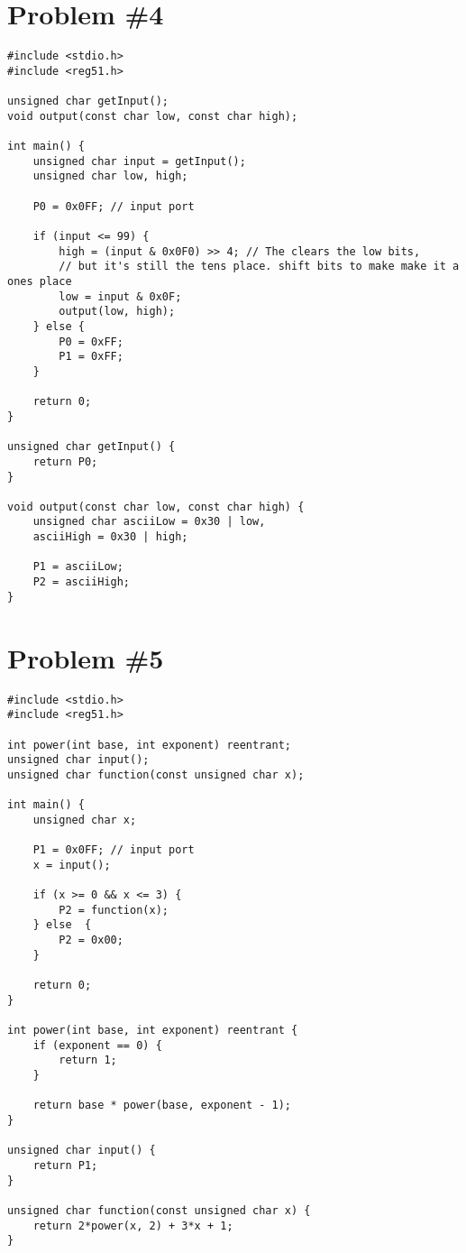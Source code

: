 \documentclass[12pt]{article}
\begin{document}
\section{Problem \#4}
\begin{verbatim}
#include <stdio.h>
#include <reg51.h>

unsigned char getInput();
void output(const char low, const char high);

int main() {
    unsigned char input = getInput();
    unsigned char low, high;

    P0 = 0x0FF; // input port

    if (input <= 99) {
        high = (input & 0x0F0) >> 4; // The clears the low bits,
        // but it's still the tens place. shift bits to make make it a ones place
        low = input & 0x0F;
        output(low, high);
    } else {
        P0 = 0xFF;
        P1 = 0xFF;
    }

    return 0;
}

unsigned char getInput() {
    return P0;
}

void output(const char low, const char high) {
    unsigned char asciiLow = 0x30 | low,
    asciiHigh = 0x30 | high;

    P1 = asciiLow;
    P2 = asciiHigh;
}

\end{verbatim}

\section{Problem \#5}
\begin{verbatim}
#include <stdio.h>
#include <reg51.h>

int power(int base, int exponent) reentrant;
unsigned char input();
unsigned char function(const unsigned char x);

int main() {
    unsigned char x;

    P1 = 0x0FF; // input port
    x = input();

    if (x >= 0 && x <= 3) {
        P2 = function(x);
    } else  {
        P2 = 0x00;
    }

    return 0;
}

int power(int base, int exponent) reentrant {
    if (exponent == 0) {
        return 1;
    }

    return base * power(base, exponent - 1);
}

unsigned char input() {
    return P1;
}

unsigned char function(const unsigned char x) {
    return 2*power(x, 2) + 3*x + 1;
}
\end{verbatim}
\end{document}
